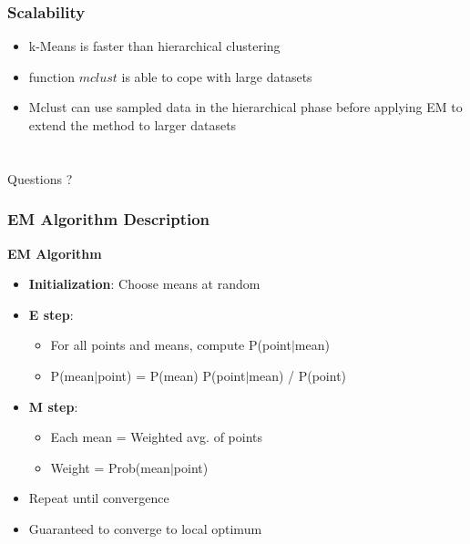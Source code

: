\documentclass{beamer}
\begin{document}
\begin{frame}
\frametitle{Scalability}
\begin{itemize}
\item k-Means is faster than hierarchical clustering
\item function $mclust$ is able to cope with large datasets
\item Mclust can use sampled data in the hierarchical phase before applying EM to extend the method to larger datasets
\end{itemize}
\end{frame}

\section{ }
\begin{frame}
\begin{center}
Questions ?
  \end{center}
\end{frame}


\begin{frame}
\frametitle{EM Algorithm Description}
\textbf{EM Algorithm}
\begin{center}
  \begin{itemize}
  \item \textbf{Initialization}: Choose means at random
\item \textbf{E step}:
\begin{itemize}
\item For all points and means, compute P(point$|$mean)
\item P(mean$|$point) = P(mean) P(point$|$mean) / P(point)
\end{itemize}
\item \textbf{M step}:
\begin{itemize}
\item Each mean = Weighted avg. of points
\item Weight = Prob(mean$|$point)
\end{itemize}
\item Repeat until convergence
\item Guaranteed to converge to local optimum
\end{itemize}
\end{center}
\end{frame}
\end{document}
